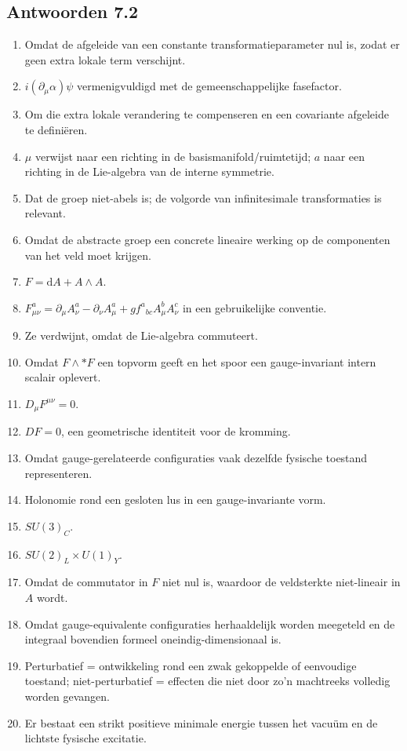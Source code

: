 \documentclass[11pt,a4paper]{article}
\newcommand{\dd}{\mathrm{d}}
\begin{document}
\subsection*{Antwoorden 7.2}
\begin{enumerate}
\item Omdat de afgeleide van een constante transformatieparameter nul is, zodat er geen extra lokale term verschijnt.
\item $i(\partial_\mu\alpha)\psi$ vermenigvuldigd met de gemeenschappelijke fasefactor.
\item Om die extra lokale verandering te compenseren en een covariante afgeleide te definiëren.
\item $\mu$ verwijst naar een richting in de basismanifold/ruimtetijd; $a$ naar een richting in de Lie-algebra van de interne symmetrie.
\item Dat de groep niet-abels is; de volgorde van infinitesimale transformaties is relevant.
\item Omdat de abstracte groep een concrete lineaire werking op de componenten van het veld moet krijgen.
\item $F=\dd A+A\wedge A$.
\item $F^a_{\mu\nu}=\partial_\mu A^a_\nu-\partial_\nu A^a_\mu+g f^a{}_{bc}A^b_\mu A^c_\nu$ in een gebruikelijke conventie.
\item Ze verdwijnt, omdat de Lie-algebra commuteert.
\item Omdat $F\wedge *F$ een topvorm geeft en het spoor een gauge-invariant intern scalair oplevert.
\item $D_\mu F^{\mu\nu}=0$.
\item $DF=0$, een geometrische identiteit voor de kromming.
\item Omdat gauge-gerelateerde configuraties vaak dezelfde fysische toestand representeren.
\item Holonomie rond een gesloten lus in een gauge-invariante vorm.
\item $SU(3)_C$.
\item $SU(2)_L\times U(1)_Y$.
\item Omdat de commutator in $F$ niet nul is, waardoor de veldsterkte niet-lineair in $A$ wordt.
\item Omdat gauge-equivalente configuraties herhaaldelijk worden meegeteld en de integraal bovendien formeel oneindig-dimensionaal is.
\item Perturbatief = ontwikkeling rond een zwak gekoppelde of eenvoudige toestand; niet-perturbatief = effecten die niet door zo'n machtreeks volledig worden gevangen.
\item Er bestaat een strikt positieve minimale energie tussen het vacuüm en de lichtste fysische excitatie.
\end{enumerate}
\end{document}
